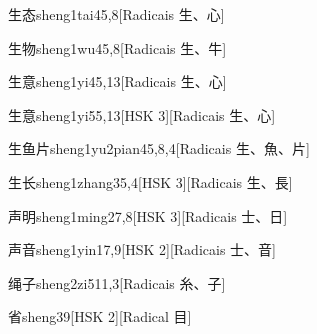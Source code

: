 \begin{entry}{生态}{sheng1tai4}{5,8}[Radicais ⽣、⼼]
\end{entry}

\begin{entry}{生物}{sheng1wu4}{5,8}[Radicais ⽣、⽜]
\end{entry}

\begin{entry}{生意}{sheng1yi4}{5,13}[Radicais ⽣、⼼]
\end{entry}

\begin{entry}{生意}{sheng1yi5}{5,13}[HSK 3][Radicais ⽣、⼼]
\end{entry}

\begin{entry}{生鱼片}{sheng1yu2pian4}{5,8,4}[Radicais ⽣、⿂、⽚]
\end{entry}

\begin{entry}{生长}{sheng1zhang3}{5,4}[HSK 3][Radicais ⽣、⾧]
\end{entry}

\begin{entry}{声明}{sheng1ming2}{7,8}[HSK 3][Radicais ⼠、⽇]
\end{entry}

\begin{entry}{声音}{sheng1yin1}{7,9}[HSK 2][Radicais ⼠、⾳]
\end{entry}

\begin{entry}{绳子}{sheng2zi5}{11,3}[Radicais ⽷、⼦]
\end{entry}

\begin{entry}{省}{sheng3}{9}[HSK 2][Radical ⽬]
\end{entry}

